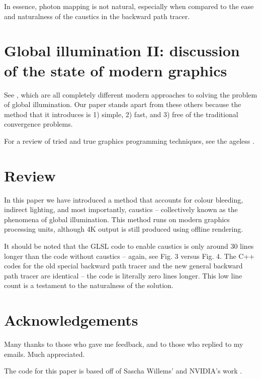 \documentclass[12pt]{article}
\begin{document}
In essence, photon mapping is not natural, especially when compared to the ease and naturalness of the caustics in the backward path tracer.






\section{Global illumination II: discussion of the state of modern graphics}

See \cite{moreau, komarov, gruen, yang}, which are all completely different modern approaches to solving the problem of global illumination.
Our paper stands apart from these others because the method that it introduces is 1) simple, 2) fast, and 3) free of the traditional convergence problems.

For a review of tried and true graphics programming techniques, see the ageless \cite{pharr}.





\section{Review}

In this paper we have introduced a method that accounts for colour bleeding, indirect lighting, and most importantly, caustics -- collectively known as the phenomena of global illumination.
This method runs on modern graphics processing units, although 4K output is still produced using offline rendering.

It should be noted that the GLSL code to enable caustics is only around $30$ lines longer than the code without caustics -- again, see Fig. 3 versus Fig. 4.
The C++ codes for the old special backward path tracer and the new general backward path tracer are identical -- the code is literally zero lines longer.
This low line count is a testament to the naturalness of the solution.






\section{Acknowledgements}

Many thanks to those who gave me feedback, and to those who replied to my emails.
Much appreciated.

The code for this paper is based off of Sascha Willems' and NVIDIA's work \cite{willems1, willems2, nvidia}.
\end{document}
